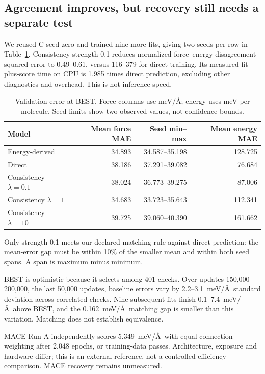 \documentclass{article}
\begin{document}
\subsection{Agreement improves, but recovery still needs a separate test}
We reused C seed zero and trained nine more fits, giving two seeds per row in Table~\ref{tab:prediction}. Consistency strength 0.1 reduces normalized force--energy disagreement squared error to 0.49--0.61, versus 116--379 for direct training. Its measured fit-plus-score time on CPU is 1.985 times direct prediction, excluding other diagnostics and overhead. This is not inference speed.

\begin{table}[htbp]
\centering\small
\caption{Validation error at BEST. Force columns use meV/\AA; energy uses meV per molecule. Seed limits show two observed values, not confidence bounds.}\label{tab:prediction}
\begin{tabular}{lrrr}\toprule
Model & Mean force MAE & Seed min--max & Mean energy MAE\\\midrule
Energy-derived & 34.893 & 34.587--35.198 & 128.725\\
Direct & 38.186 & 37.291--39.082 & 76.684\\
Consistency $\lambda=0.1$ & 38.024 & 36.773--39.275 & 87.006\\
Consistency $\lambda=1$ & 34.683 & 33.723--35.643 & 112.341\\
Consistency $\lambda=10$ & 39.725 & 39.060--40.390 & 161.662\\\bottomrule
\end{tabular}
\end{table}

Only strength 0.1 meets our declared matching rule against direct prediction: the mean-error gap must be within 10\% of the smaller mean and within both seed spans. A span is maximum minus minimum.

BEST is optimistic because it selects among 401 checks. Over updates 150,000--200,000, the last 50,000 updates, baseline errors vary by 2.2--3.1~meV/\AA\ standard deviation across correlated checks. Nine subsequent fits finish 0.1--7.4~meV/\AA\ above BEST, and the 0.162~meV/\AA\ matching gap is smaller than this variation. Matching does not establish equivalence.

MACE Run A independently scores 5.349~meV/\AA\ with equal connection weighting after 2,048 epochs, or training-data passes. Architecture, exposure and hardware differ; this is an external reference, not a controlled efficiency comparison. MACE recovery remains unmeasured.
\end{document}
